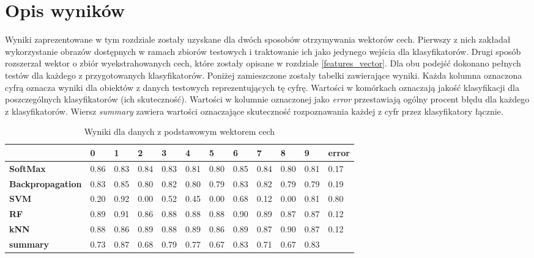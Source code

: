 \documentclass{article}
\begin{document}
\section{Opis wyników}
Wyniki zaprezentowane w tym rozdziale zostały uzyskane dla dwóch sposobów otrzymywania wektorów cech. Pierwszy z nich zakładał wykorzystanie obrazów dostępnych w ramach zbiorów testowych i traktowanie ich jako jedynego wejścia dla klasyfikatorów. Drugi sposób rozszerzał wektor o zbiór wyekstrahowanych cech, które zostały opisane w rozdziale \ref{features_vector}. Dla obu podejść dokonano pełnych testów dla każdego z przygotowanych klasyfikatorów. Poniżej zamieszczone zostały tabelki zawierające wyniki. Każda kolumna oznaczona cyfrą oznacza wyniki dla obiektów z danych testowych reprezentujących tę cyfrę. Wartości w komórkach oznaczają jakość klasyfikacji dla poszczególnych klasyfikatorów (ich skuteczność). Wartości w kolumnie oznaczonej jako \textit{error} przestawiają ogólny procent błędu dla każdego z klasyfikatorów. Wiersz \textit{summary} zawiera wartości oznaczające skuteczność rozpoznawania każdej z cyfr przez klasyfikatory łącznie.

\begin{table}[htp]
	\centering
	\caption{Wyniki dla danych z podstawowym wektorem cech}
	\label{basic-vector-results}
\begin{tabular}{l|l|l|l|l|l|l|l|l|l|l|l|}
	\cline{2-12}
	& \textbf{0} & \textbf{1} & \textbf{2} & \textbf{3} & \textbf{4} & \textbf{5} & \textbf{6} & \textbf{7} & \textbf{8} & \textbf{9} & \textbf{error} \\ \hline
	\multicolumn{1}{|l|}{\textbf{SoftMax}}         & 0.86       & 0.83       & 0.84       & 0.83       & 0.81       & 0.80       & 0.85       & 0.84       & 0.80       & 0.81       & 0.17                \\ \hline
	\multicolumn{1}{|l|}{\textbf{Backpropagation}} & 0.83       & 0.85       & 0.80       & 0.82       & 0.80       & 0.79       & 0.83       & 0.82       & 0.79       & 0.79       & 0.19                \\ \hline
	\multicolumn{1}{|l|}{\textbf{SVM}}             & 0.20       & 0.92       & 0.00       & 0.52       & 0.45       & 0.00       & 0.68       & 0.12       & 0.00       & 0.81       & 0.80                \\ \hline
	\multicolumn{1}{|l|}{\textbf{RF}}              & 0.89       & 0.91       & 0.86       & 0.88       & 0.88       & 0.88       & 0.90       & 0.89       & 0.87       & 0.87       & 0.12                \\ \hline
	\multicolumn{1}{|l|}{\textbf{kNN}}             & 0.88       & 0.86       & 0.89       & 0.88       & 0.89       & 0.86       & 0.89       & 0.87       & 0.90       & 0.87       & 0.12                \\ \hline
	\multicolumn{1}{|l|}{\textbf{summary}}         & 0.73       & 0.87       & 0.68       & 0.79       & 0.77       & 0.67       & 0.83       & 0.71       & 0.67       & 0.83       &                     \\ \hline
\end{tabular}
\end{table}
\end{document}
